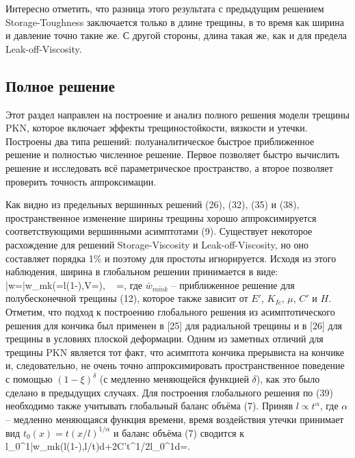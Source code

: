\documentclass[main.tex]{subfiles}
\begin{document}
Интересно отметить, что разница этого результата с предыдущим решением Storage-Toughness заключается только в длине трещины, в то время как ширина и давление точно такие же.
С другой стороны, длина такая же, как и для предела Leak-off-Viscosity.


\subsection{Полное решение}

Этот раздел направлен на построение и анализ полного решения модели трещины PKN, которое включает эффекты трещиностойкости, вязкости и утечки.
Построены два типа решений: полуаналитическое быстрое приближенное решение и полностью численное решение.
Первое позволяет быстро вычислить решение и исследовать всё параметрическое пространство, а второе позволяет проверить точность аппроксимации.

Как видно из предельных вершинных решений (26), (32), (35) и (38), пространственное изменение ширины трещины хорошо аппроксимируется соответствующими вершинными асимптотами (9).
Существует некоторое расхождение для решений Storage-Viscosity и Leak-off-Viscosity, но оно составляет порядка 1\% и поэтому для простоты игнорируется.
Исходя из этого наблюдения, ширина в глобальном решении принимается в виде:
\beq
\bar{w}=\bar{w}_{mk}\left(=l\left(1-\xi\right),V=\right),\,\,\,\,\,
\xi=,
\eeq
где $\bar{w}_{m\tilde{m}k}$ -- приближенное решение для полубесконечной трещины (12), которое также зависит от $E'$, $K_{Ic}$, $\mu$, $C'$ и $H$.
Отметим, что подход к построению глобального решения из асимптотического решения для кончика был применен в [25] для радиальной трещины и в [26] для трещины в условиях плоской деформации.
Одним из заметных отличий для трещины PKN является тот факт, что асимптота кончика прерывиста на кончике и, следовательно, не очень точно аппроксимировать пространственное поведение с помощью $\left(1-\xi\right)^{\delta}$ (с медленно меняющейся функцией $\delta$), как это было сделано в предыдущих случаях.
Для построения глобального решения по (39) необходимо также учитывать глобальный баланс объёма (7).
Приняв $l\propto t^{\alpha}$, где $\alpha$ -- медленно меняющаяся функция времени, время воздействия утечки принимает вид $t_0(x)=t(x/l)^{1/\alpha}$ и баланс объёма (7) сводится к
\beq
l\int\limits_{0}^{1}{\bar{w}_{mk}}\left(l\left(1-\xi\right),\alpha l/t\right)d\xi+2C't^{1/2}l\int\limits_{0}^{1}{}d\xi=.
\eeq
\end{document}
